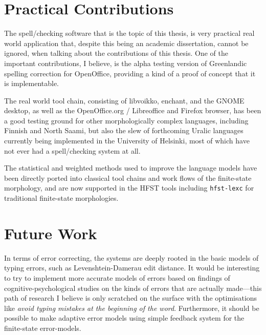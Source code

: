 \documentclass[officiallayout]{unihelcompling}
\begin{document}
\section{Practical Contributions}
\label{sec:practical-contributions}

The spell\-/checking software that is the topic of this thesis, is very
practical real world application that, despite this being an academic
dissertation, cannot be ignored, when talking about the contributions of this
thesis. One of the important contributions, I believe, is the alpha testing
version of Greenlandic spelling correction for OpenOffice, providing a kind of
a proof of concept that it is implementable.

The real world tool chain, consisting of libvoikko, enchant, and the GNOME
desktop, as well as the OpenOffice.org / Libreoffice and Firefox browser, has
been a good testing ground for other morphologically complex languages,
including Finnish and North Saami, but also the slew of forthcoming Uralic
languages currently being implemented in the University of Helsinki, most of
which have not ever had a spell\-/checking system at all. 

The statistical and weighted methods used to improve the language models have
been directly ported into classical tool chains and work flows of the 
finite-state morphology, and are now supported in the HFST tools including
\texttt{hfst-lexc} for traditional finite-state morphologies.

\section{Future Work}
\label{sec:future-work}

In terms of error correcting, the systems are deeply rooted in the basic models
of typing errors, such as Levenshtein-Damerau edit distance. It would be
interesting to try to implement more accurate models of errors based on
findings of cognitive-psychological studies on the kinds of errors that are
actually made---this path of research I believe is only scratched on the
surface with the optimisations like \emph{avoid typing mistakes at the
beginning of the word}. Furthermore, it should be possible to make adaptive
error models using simple feedback system for the finite-state error-models.
\end{document}
